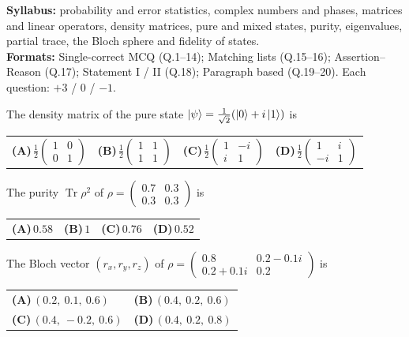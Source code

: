 \documentclass[11pt,a4paper]{article}
\newcommand{\optlabel}[1]{\textbf{(#1)}}
\newenvironment{qitem}[1]{\begin{list}{}{\setlength{\leftmargin}{3.3em}\setlength{\labelwidth}{3.1em}%
  \setlength{\labelsep}{0.2em}\setlength{\topsep}{3pt}\setlength{\parsep}{3pt}}\item[\textbf{Q.#1}\hfill]}{\end{list}}
\newcommand{\qsep}{\par\vspace{2pt}{\color{black!15}\hrule}\vspace{4pt}}
\begin{document}
{\small \textbf{Syllabus:} probability and error statistics, complex numbers and phases, matrices and linear operators, density matrices, pure and mixed states, purity, eigenvalues, partial trace, the Bloch sphere and fidelity of states.\\ \textbf{Formats:} Single-correct MCQ (Q.1--14); Matching lists (Q.15--16); Assertion--Reason (Q.17); Statement I / II (Q.18); Paragraph based (Q.19--20). Each question: $+3$ / $0$ / $-1$.}
\par\medskip

\begin{qitem}{1}
The density matrix of the pure state $\ket\psi = \frac{1}{\sqrt2}(\ket0 + i\ket1)$ is
\par\smallskip\noindent\begin{tabularx}{\linewidth}{@{}*{4}{L}@{}}
\optlabel{A}\,$\frac12\begin{pmatrix}1 & 0\\ 0 & 1\end{pmatrix}$ & \optlabel{B}\,$\frac12\begin{pmatrix}1 & 1\\ 1 & 1\end{pmatrix}$ & \optlabel{C}\,$\frac12\begin{pmatrix}1 & -i\\ i & 1\end{pmatrix}$ & \optlabel{D}\,$\frac12\begin{pmatrix}1 & i\\ -i & 1\end{pmatrix}$
\end{tabularx}
\end{qitem}
\qsep

\begin{qitem}{2}
The purity $\operatorname{Tr}\rho^2$ of $\rho = \begin{pmatrix}0.7 & 0.3\\ 0.3 & 0.3\end{pmatrix}$ is
\par\smallskip\noindent\begin{tabularx}{\linewidth}{@{}*{4}{L}@{}}
\optlabel{A}\,$0.58$ & \optlabel{B}\,$1$ & \optlabel{C}\,$0.76$ & \optlabel{D}\,$0.52$
\end{tabularx}
\end{qitem}
\qsep

\begin{qitem}{3}
The Bloch vector $(r_x, r_y, r_z)$ of $\rho = \begin{pmatrix}0.8 & 0.2 - 0.1i\\ 0.2 + 0.1i & 0.2\end{pmatrix}$ is
\par\smallskip\noindent\begin{tabularx}{\linewidth}{@{}*{2}{L}@{}}
\optlabel{A}\,$(0.2,\ 0.1,\ 0.6)$ & \optlabel{B}\,$(0.4,\ 0.2,\ 0.6)$ \\[3pt]
\optlabel{C}\,$(0.4,\ -0.2,\ 0.6)$ & \optlabel{D}\,$(0.4,\ 0.2,\ 0.8)$
\end{tabularx}
\end{qitem}
\qsep
\end{document}
